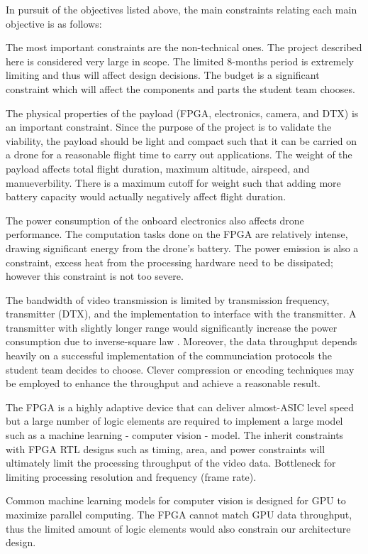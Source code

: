 In pursuit of the objectives listed above, the main constraints relating 
each main objective is as follows:

The most important constraints are the non-technical ones. The project described
here is considered very large in scope. The limited 8-months period is extremely
limiting and thus will affect design decisions. The budget is a significant
constraint which will affect the components and parts the student team chooses.

The physical properties of the payload (FPGA, electronics, camera, and  DTX) is an important constraint. Since the purpose of the project
is to validate the viability, the payload should be light and compact such
that it can be carried on a drone for a reasonable flight time to carry
out applications. The weight of the payload affects total flight duration, maximum altitude, airspeed, and manueverbility. 
There is a maximum cutoff for weight such that adding more battery capacity would actually negatively affect flight duration.

The power consumption of the onboard electronics also affects drone performance.
The computation tasks done on the FPGA are relatively intense, drawing significant energy from the drone's battery. 
The power emission is also a constraint, excess heat from the processing
hardware need to be dissipated; however this constraint is not too severe.

The bandwidth of video transmission is limited by transmission frequency, transmitter (DTX), and
the implementation to interface with the transmitter. A transmitter with slightly longer range would
significantly increase the power consumption due to inverse-square law \cite{wiki-inverse-square}.
Moreover, the data throughput depends heavily on a successful implementation of the communciation
protocols the student team decides to choose. Clever compression or encoding techniques may be
employed to enhance the throughput and achieve a reasonable result.

The FPGA is a highly adaptive device that can deliver almost-ASIC level speed
but a large number of logic elements are required to implement a large model 
such as a machine learning - computer vision - model. The inherit constraints
with FPGA RTL designs such as timing, area, and power constraints will ultimately
limit the processing throughput of the video data. Bottleneck for limiting
processing resolution and frequency (frame rate).

Common machine learning models for computer vision is designed for GPU to
maximize parallel computing. The FPGA cannot match GPU data throughput, thus
the limited amount of logic elements would also constrain our architecture
design.
